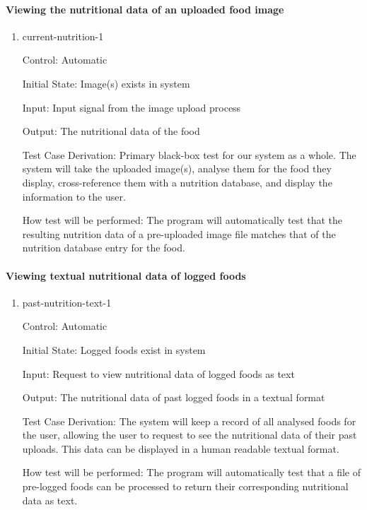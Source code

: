 \documentclass[12pt, titlepage]{article}
\begin{document}
	\paragraph{Viewing the nutritional data of an uploaded food image}
	
	\begin{enumerate}
		
		\item{current-nutrition-1\\}
		
		Control: Automatic
		
		Initial State: Image(s) exists in system
		
		Input: Input signal from the image upload process
		
		Output: The nutritional data of the food
		
		Test Case Derivation: Primary black-box test for our system as a whole. The system will take the uploaded image(s), analyse them for the food they display, cross-reference them with a nutrition database, and display the information to the user.
		
		How test will be performed: The program will automatically test that the resulting nutrition data of a pre-uploaded image file matches that of the nutrition database entry for the food.
		
	\end{enumerate}
	
	\paragraph{Viewing textual nutritional data of logged foods}
	
	\begin{enumerate}
		
		\item{past-nutrition-text-1\\}
		
		Control: Automatic
		
		Initial State: Logged foods exist in system
		
		Input: Request to view nutritional data of logged foods as text
		
		Output: The nutritional data of past logged foods in a textual format
		
		Test Case Derivation: The system will keep a record of all analysed foods for the user, allowing the user to request to see the nutritional data of their past uploads. This data can be displayed in a human readable textual format.
		
		How test will be performed: The program will automatically test that a file of pre-logged foods can be processed to return their corresponding nutritional data as text.
		
	\end{enumerate}
	
\end{document}
